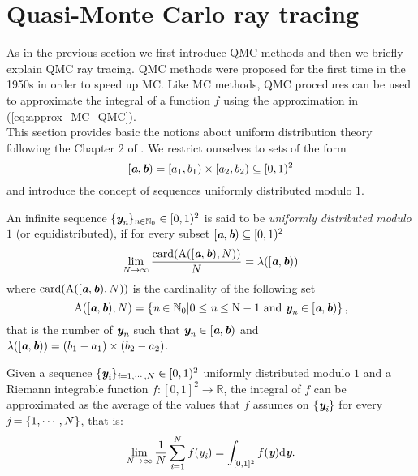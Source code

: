 \section{Quasi-Monte Carlo ray tracing}\label{sec:QMC}
As in the previous section we first introduce QMC methods and then we briefly explain QMC ray tracing. QMC methods were proposed for the first time in the 1950s in order to speed up MC. Like MC methods, QMC procedures can be used to approximate the integral of a function $f$ using the approximation in (\ref{eq:approx_MC_QMC}).\\ \indent
This section provides basic the notions about uniform distribution theory following the Chapter $2$ of \cite{leobacher2014introduction}. 
We restrict ourselves to sets of the form $$[\textit{\textbf{a}}, \textit{\textbf{b}})= [a_1,b_1)\times[a_2, b_2)\subseteq[0,1)^2$$ and introduce the concept of sequences uniformly distributed modulo $1$.
\begin{definition}
An infinite sequence $\{\textit{\textbf{y}}_{\textit{n}}\}_{\textit{n}\in\mathbb{N}_0} \in [0,1)^2$ is said to be \textit{uniformly distributed modulo $1$} (or equidistributed), if for every subset $[\textit{\textbf{a}},\textit{\textbf{b}})\subseteq[0,1)^2$
\begin{equation}
\lim_{N\rightarrow \infty}\frac{\textrm{card}(\mbox{$\textup{A}$}([\textit{\textbf{a}},\textit{\textbf{b}}), N))}{N} = \lambda([\textit{\textbf{a}},\textit{\textbf{b}}))
\end{equation}
where $\textrm{card}(\insieme{A}([\vect{a},\vect{b}), N))$ is the cardinality of the following set
\begin{equation}
\mbox{$\textup{A}$}([\textit{\textbf{a}},\textit{\textbf{b}}), N) = \{\textit{n}\in \mathbb{N}_0 | 0\leq\textit{n}\leq \textrm{N}-1 \mbox{ and } \textit{\textbf{y}}_{\textit{n}}\in [\textit{\textbf{a}},\textit{\textbf{b}})\}\,,
\end{equation} 
that is the number of $\textit{\textbf{y}}_{\textit{n}}$ such that $\textit{\textbf{y}}_{\textit{n}}\in [\textit{\textbf{a}},\textit{\textbf{b}})$ and $\lambda([\textit{\textbf{a}},\textit{\textbf{b}})) =(b_1-a_1)\times (b_2-a_2)$.
\end{definition}
Given a sequence $\{\textit{\textbf{y}}_{\textit{i}}\}_{\textit{i} = 1, \cdots, N}\in[0,1)^2$ uniformly distributed modulo $1$ and a 
Riemann integrable function $f:[0,1]^2\rightarrow \mathbb{R}$, the integral of $f$ can be approximated as the average of the values that $f$ assumes on $\{\textit{\textbf{y}}_{\textit{i}}\}$ for every $\textit{j}=\{1, \cdots, N\}$, that is:
\begin{equation}
 \lim_{N\rightarrow \infty}\frac{1}{N}\sum_{\textit{i}=1}^{N}f(\textit{y}_{\textit{i}}) = \int_{[0,1]^2}f(\textit{\textbf{y}})\textrm{d}\textit{\textbf{y}}.
\end{equation}
